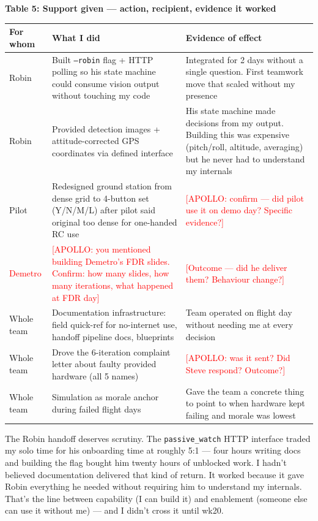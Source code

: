 \vspace{0.2em}
{\small
\noindent\textbf{Table 5: Support given --- action, recipient, evidence it worked}

\begin{tabularx}{\textwidth}{@{}l L L@{}}
\toprule
\textbf{For whom} & \textbf{What I did} & \textbf{Evidence of effect} \\
\midrule
Robin & Built \texttt{--robin} flag + HTTP polling so his state machine could consume vision output without touching my code & Integrated for 2 days without a single question. First teamwork move that scaled without my presence \\
Robin & Provided detection images + attitude-corrected GPS coordinates via defined interface & His state machine made decisions from my output. Building this was expensive (pitch/roll, altitude, averaging) but he never had to understand my internals \\
Pilot & Redesigned ground station from dense grid to 4-button set (Y/N/M/L) after pilot said original too dense for one-handed RC use & \textcolor{red}{[APOLLO: confirm --- did pilot use it on demo day? Specific evidence?]} \\
\textcolor{red}{Demetro} & \textcolor{red}{[APOLLO: you mentioned building Demetro's FDR slides. Confirm: how many slides, how many iterations, what happened at FDR day]} & \textcolor{red}{[Outcome --- did he deliver them? Behaviour change?]} \\
Whole team & Documentation infrastructure: field quick-ref for no-internet use, handoff pipeline docs, blueprints & Team operated on flight day without needing me at every decision \\
Whole team & Drove the 6-iteration complaint letter about faulty provided hardware (all 5 names) & \textcolor{red}{[APOLLO: was it sent? Did Steve respond? Outcome?]} \\
Whole team & Simulation as morale anchor during failed flight days & Gave the team a concrete thing to point to when hardware kept failing and morale was lowest \\
\bottomrule
\end{tabularx}
}
\vspace{0.2em}

The Robin handoff deserves scrutiny. The \texttt{passive\_watch} HTTP interface traded my solo time for his onboarding time at roughly 5:1 --- four hours writing docs and building the flag bought him twenty hours of unblocked work. I hadn't believed documentation delivered that kind of return. It worked because it gave Robin everything he needed without requiring him to understand my internals. That's the line between capability (I can build it) and enablement (someone else can use it without me) --- and I didn't cross it until wk20.


